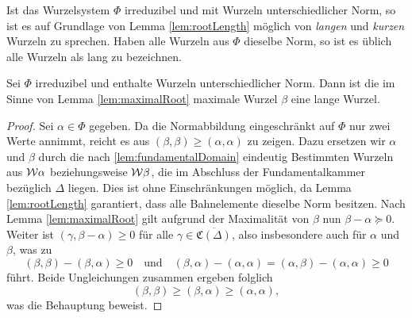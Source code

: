 \begin{bem}
  Ist das Wurzelsystem $\Phi$ irreduzibel und mit Wurzeln unterschiedlicher Norm, so ist es auf Grundlage von Lemma \ref{lem:rootLength} möglich von \emph{langen} und \emph{kurzen} Wurzeln zu sprechen.
  Haben alle Wurzeln aus $\Phi$ dieselbe Norm, so ist es üblich alle Wurzeln als lang zu bezeichnen.
\end{bem}

\begin{lem}
  Sei $\Phi$ irreduzibel und enthalte Wurzeln unterschiedlicher Norm.
  Dann ist die im Sinne von Lemma \ref{lem:maximalRoot} maximale Wurzel $\beta$ eine lange Wurzel.
\end{lem}

\begin{proof}
  Sei $\alpha \in \Phi$ gegeben.
  Da die Normabbildung eingeschränkt auf $\Phi$ nur zwei Werte annimmt, reicht es aus $(\beta, \beta) \geq (\alpha, \alpha)$ zu zeigen.
  Dazu ersetzen wir $\alpha$ und $\beta$ durch die nach \ref{lem:fundamentalDomain} eindeutig Bestimmten Wurzeln aus $\mathcal{W}\alpha$ beziehungsweise $\mathcal{W}\beta$, die im Abschluss der Fundamentalkammer bezüglich $\Delta$ liegen. 
  Dies ist ohne Einschränkungen möglich, da Lemma \ref{lem:rootLength} garantiert, dass alle Bahnelemente dieselbe Norm besitzen.
  Nach Lemma \ref{lem:maximalRoot} gilt aufgrund der Maximalität von $\beta$ nun $\beta - \alpha \succeq 0$.
  Weiter ist $(\gamma, \beta - \alpha) \geq 0$ für alle $\gamma \in \overline{\mathfrak{C}(\Delta)}$, also insbesondere auch für $\alpha$ und $\beta$, was zu 
  \begin{displaymath}
    (\beta, \beta) - (\beta, \alpha) \geq 0 \quad\text{und}\quad 
    (\beta, \alpha) - (\alpha, \alpha) 
    = (\alpha, \beta) - (\alpha, \alpha) \geq 0
  \end{displaymath}
  führt.
  Beide Ungleichungen zusammen ergeben folglich
  \begin{displaymath}
    (\beta, \beta) \geq (\beta, \alpha) \geq (\alpha, \alpha),
  \end{displaymath}
  was die Behauptung beweist.
\end{proof}
